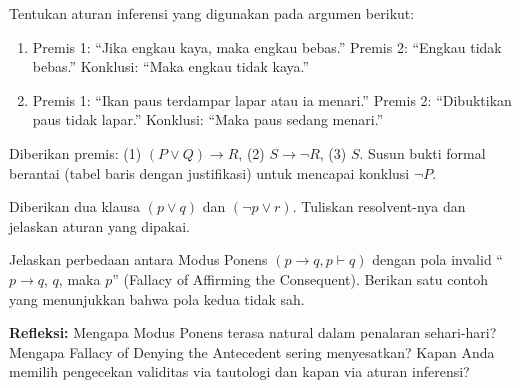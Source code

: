 \documentclass[../main]{subfiles}
\begin{document}

\begin{latihan}
  \item Tentukan aturan inferensi yang digunakan pada argumen berikut:
  \begin{enumerate}
    \item Premis 1: ``Jika engkau kaya, maka engkau bebas.'' Premis 2: ``Engkau tidak bebas.'' Konklusi: ``Maka engkau tidak kaya.''
    \item Premis 1: ``Ikan paus terdampar lapar atau ia menari.'' Premis 2: ``Dibuktikan paus tidak lapar.'' Konklusi: ``Maka paus sedang menari.''
  \end{enumerate}
  \item Diberikan premis: (1) $(P \vee Q) \rightarrow R$, (2) $S \rightarrow \neg R$, (3) $S$. Susun bukti formal berantai (tabel baris dengan justifikasi) untuk mencapai konklusi $\neg P$.
  \item Diberikan dua klausa $(p \vee q)$ dan $(\neg p \vee r)$. Tuliskan resolvent-nya dan jelaskan aturan yang dipakai.
  \item Jelaskan perbedaan antara Modus Ponens $(p \rightarrow q, p \vdash q)$ dengan pola invalid ``$p \rightarrow q$, $q$, maka $p$'' (Fallacy of Affirming the Consequent). Berikan satu contoh yang menunjukkan bahwa pola kedua tidak sah.
  \item \textbf{Refleksi:} Mengapa Modus Ponens terasa natural dalam penalaran sehari-hari? Mengapa Fallacy of Denying the Antecedent sering menyesatkan? Kapan Anda memilih pengecekan validitas via tautologi dan kapan via aturan inferensi?
\end{latihan}

\end{document}
